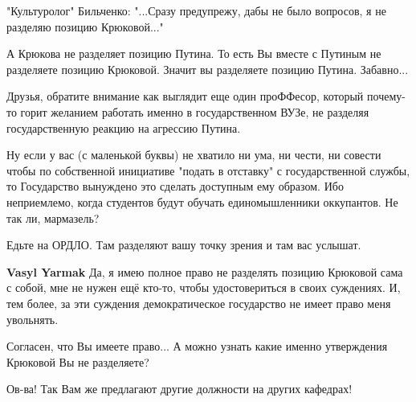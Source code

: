 \begin{itemize}
 

"Культуролог" Бильченко: "...Сразу предупрежу, дабы не было вопросов, я не
разделяю позицию Крюковой..."

А Крюкова не разделяет позицию Путина. То есть Вы вместе с Путиным не
разделяете позицию Крюковой. Значит вы разделяете позицию Путина. Забавно...

Друзья, обратите внимание как выглядит еще один проФФесор, который почему-то
горит желанием работать именно в государственном ВУЗе, не разделяя
государственную реакцию на агрессию Путина.

Ну если у вас (с маленькой буквы) не хватило ни ума, ни чести, ни совести чтобы
по собственной инициативе "подать в отставку" с государственной службы, то
Государство вынуждено это сделать доступным ему образом. Ибо неприемлемо, когда
студентов будут обучать единомышленники оккупантов. Не так ли, мармазель?

Едьте на ОРДЛО. Там разделяют вашу точку зрения и там вас услышат.

\begin{itemize}
 
\textbf{Vasyl Yarmak} Да, я имею полное право не разделять позицию Крюковой сама с собой, мне не нужен ещё кто-то, чтобы удостовериться в своих суждениях. И, тем более, за эти суждения демократическое государство не имеет право меня увольнять.

 
Согласен, что Вы имеете право... А можно узнать какие именно утверждения Крюковой Вы не разделяете?

 

Ов-ва! Так Вам же предлагают другие должности на других кафедрах!


\end{itemize}
\end{itemize}
